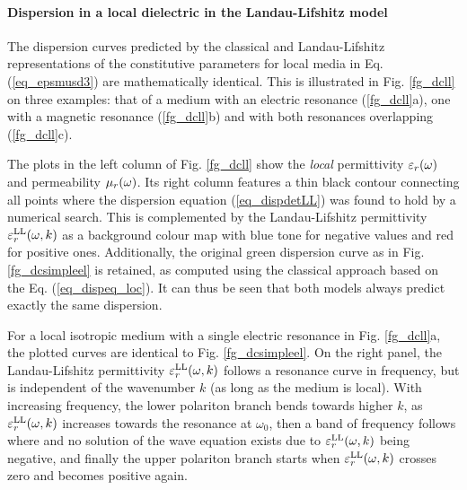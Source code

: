 \paragraph{Dispersion in a local dielectric in the Landau-Lifshitz model} %
The dispersion curves predicted by the classical and Landau-Lifshitz representations of the constitutive parameters for local media in Eq. (\ref{eq_epsmusd3}) are mathematically identical. This is illustrated in Fig. \ref{fg_dcll} on three examples: that of a medium with an electric resonance (\ref{fg_dcll}a), one with  a magnetic resonance (\ref{fg_dcll}b) and  with both resonances overlapping (\ref{fg_dcll}c). 

The plots in the left column of Fig. \ref{fg_dcll} show the \textit{local} permittivity $\varepsilon_r(\omega)$ and permeability $\mu_r(\omega)$.
Its right column features a thin black contour connecting all points where the dispersion equation (\ref{eq_dispdetLL}) was found to hold by a numerical search.
This is complemented by the Landau-Lifshitz permittivity $\varepsilon_r^\text{LL}(\omega, k)$ as a background colour map with blue tone for negative values and red for positive ones. 
Additionally, the original green dispersion curve as in Fig. \ref{fg_dcsimpleel} is retained, as computed using the classical approach based on the Eq. (\ref{eq_dispeq_loc}). It can thus be seen that both models always predict exactly the same dispersion.

For a local isotropic medium with a single electric resonance in Fig. \ref{fg_dcll}a, the plotted curves are identical to Fig. \ref{fg_dcsimpleel}. On the right panel, the Landau-Lifshitz permittivity $\varepsilon_r^\text{LL}(\omega, k)$ follows a resonance curve in frequency, but is independent of the wavenumber $k$ (as long as the medium is local). With increasing frequency, the lower polariton branch bends towards higher $k$, as $\varepsilon_r^\text{LL}(\omega, k)$ increases towards the resonance at $\omega_0$, then a band of frequency follows where and no solution of the wave equation %
exists due to $\varepsilon_r^\text{LL}(\omega, k)$ being negative, and finally the upper polariton branch starts when $\varepsilon_r^\text{LL}(\omega, k)$ crosses zero and becomes positive again.

